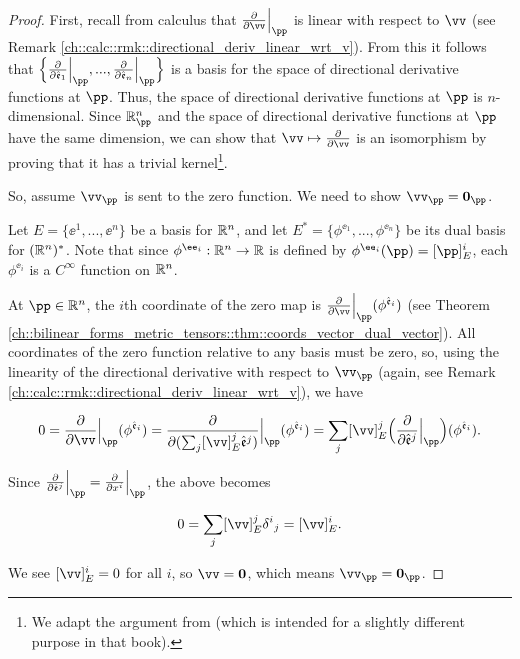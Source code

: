 \begin{proof}
    First, recall from calculus that $\frac{\pd}{\pd \vv}\Big|_\pp$ is linear with respect to $\vv$ (see Remark \ref{ch::calc::rmk::directional_deriv_linear_wrt_v}). From this it follows that $\Big\{ \frac{\pd}{\pd \see_1}\Big|_\pp, ..., \frac{\pd}{\pd \see_n}\Big|_\pp \Big\}$ is a basis for the space of directional derivative functions at $\pp$. Thus, the space of directional derivative functions at $\pp$ is $n$-dimensional. Since $\R^n_\pp$ and the space of directional derivative functions at $\pp$ have the same dimension, we can show that $\vv \mapsto \frac{\pd}{\pd \vv}$ is an isomorphism by proving that it has a trivial kernel\footnote{We adapt the argument from \cite[p. 53]{book::SM} (which is intended for a slightly different purpose in that book).}.
    
    So, assume $\vv_\pp$ is sent to the zero function. We need to show $\vv_\pp = \mathbf{0}_\pp$. 
    
    Let $E = \{\ee^1, ..., \ee^n\}$ be a basis for $\mathbb{R}^n$, and let $E^* = \{\phi^{\ee_1}, ..., \phi^{\ee_n}\}$ be its dual basis for $(\mathbb{R}^n)^*$. Note that since $\phi^{\ee_i}:\R^n \rightarrow \R$ is defined by $\phi^{\ee_i}(\pp) = [\pp]_E^i$, each $\phi^{\ee_i}$ is a $C^\infty$ function on $\mathbb{R}^n$.
    
    At $\pp \in \R^n$, the $i$th coordinate of the zero map is $\frac{\pd}{\pd \vv}\Big|_\pp (\phi^{\see_i})$ (see Theorem \ref{ch::bilinear_forms_metric_tensors::thm::coords_vector_dual_vector}). All coordinates of the zero function relative to any basis must be zero, so, using the linearity of the directional derivative with respect to $\vv_\pp$ (again, see Remark \ref{ch::calc::rmk::directional_deriv_linear_wrt_v}), we have
    
    \begin{align*}
        0 
        = \frac{\pd}{\pd \vv}\Big|_\pp (\phi^{\see_i}) 
        = \frac{\pd}{\pd (\sum_j [\vv]_E^j \see^j)}\Big|_\pp (\phi^{\see_i}) 
        = \sum_j [\vv]_E^j \Big( \frac{\pd}{\pd \see^j}\Big|_\pp \Big) (\phi^{\see_i}).
    \end{align*}
    
    Since $\frac{\pd}{\pd \see^j}\Big|_\pp = \frac{\pd}{\pd x^i}\Big|_\pp$, the above becomes
    
    \begin{align*}
        0 = \sum_j [\vv]_E^j \delta^i{}_j = [\vv]_E^i.
    \end{align*}
    
    We see $[\vv]_E^i = 0$ for all $i$, so $\vv = \mathbf{0}$, which means $\vv_\pp = \mathbf{0}_\pp$.
\end{proof}

